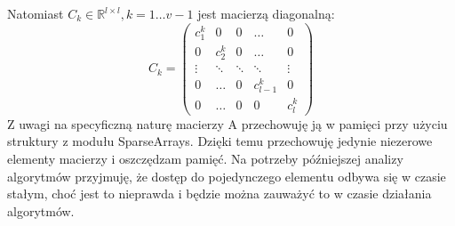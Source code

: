 \documentclass{article}
\begin{document}
Natomiast $C_k \in \mathbb R^{l \times l}, k = 1 \ldots v-1$ jest macierzą diagonalną:
$$
C_k = 
\begin{pmatrix}
    c_1^k & 0 & 0 & \ldots & 0 \\
    0 & c_2^k & 0 & \ldots & 0 \\
    \vdots & \ddots & \ddots & \ddots & \vdots \\
    0 & \ldots & 0 & c_{l-1}^k & 0 \\
    0 & \ldots & 0 & 0 & c_{l}^k
\end{pmatrix}
$$
Z uwagi na specyficzną naturę macierzy A przechowuję ją w pamięci przy użyciu struktury z 
modułu SparseArrays. Dzięki temu przechowuję jedynie niezerowe elementy macierzy i oszczędzam pamięć.
Na potrzeby późniejszej analizy algorytmów przyjmuję, że dostęp do pojedynczego elementu odbywa się 
w czasie stałym, choć jest to nieprawda i będzie można zauważyć to w czasie działania algorytmów.
\end{document}
